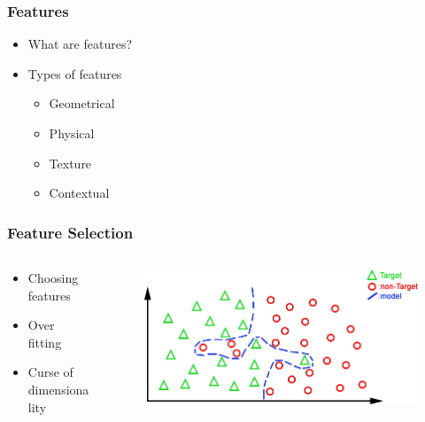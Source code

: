\documentclass{beamer}
\begin{document}

\begin{frame}
\frametitle{Features}

	\begin{itemize}
		\item What are features?
		\item Types of features 
			\begin{itemize}
				\item Geometrical 
				\item Physical 
				\item Texture 
				\item Contextual  
			\end{itemize}	
	\end{itemize}

\end{frame}


\begin{frame}
\frametitle{Feature Selection}

	\begin{columns}[T]
    \begin{column}{.5\textwidth}

	\begin{itemize}
		\item Choosing features
		\item Over fitting 
		\item Curse of dimensionality
	\end{itemize}
	
	\end{column}	
	\begin{column}{.5\textwidth}
	
	\begin{figure}
		\includegraphics[width=\textwidth]{./img/overfit2.png}
	\end{figure}

	\end{column}	
	\end{columns}
	
\end{frame}
\end{document}
